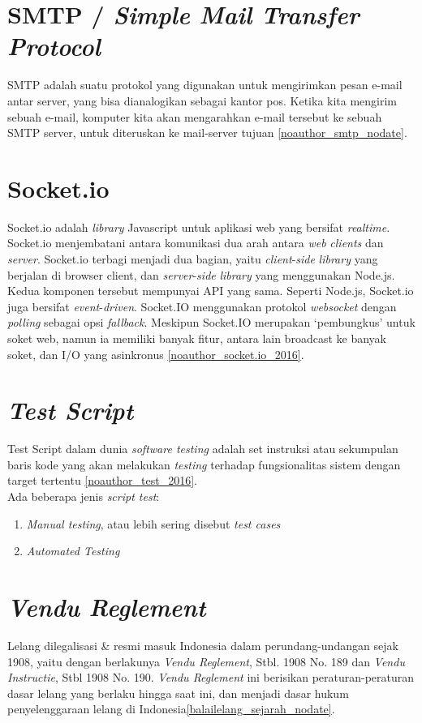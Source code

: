 	\section{SMTP / \textit{Simple Mail Transfer Protocol}}
	SMTP adalah suatu protokol yang digunakan untuk mengirimkan pesan e-mail antar server, yang bisa dianalogikan sebagai kantor pos. Ketika kita mengirim sebuah e-mail, komputer kita akan mengarahkan e-mail tersebut ke sebuah SMTP server, untuk diteruskan ke mail-server tujuan \ref{noauthor_smtp_nodate}. 
	
	\section{Socket.io}
	Socket.io adalah \textit{library} Javascript untuk aplikasi web yang bersifat \textit{realtime}. Socket.io menjembatani antara komunikasi dua arah antara \textit{web} \textit{clients} dan \textit{server}. Socket.io terbagi menjadi dua bagian, yaitu \textit{client}-\textit{side} \textit{library} yang berjalan di browser client, dan \textit{server}-\textit{side} \textit{library} yang menggunakan Node.js. Kedua komponen tersebut mempunyai API yang sama. Seperti Node.js, Socket.io juga bersifat \textit{event}-\textit{driven}. Socket.IO menggunakan protokol \textit{websocket} dengan \textit{polling} sebagai opsi \textit{fallback}. Meskipun Socket.IO merupakan ‘pembungkus’ untuk soket web, namun ia memiliki banyak fitur, antara lain broadcast ke banyak soket, dan I/O yang asinkronus \ref{noauthor_socket.io_2016}.
	
	\section{\textit{Test Script}}
	Test Script dalam dunia \textit{software testing} adalah set instruksi atau sekumpulan baris kode yang akan melakukan \textit{testing} terhadap fungsionalitas sistem dengan target tertentu \ref{noauthor_test_2016}.
	\\ \indent Ada beberapa jenis \textit{script test}:
	\begin{enumerate}
	  	\item \textit{Manual testing}, atau lebih sering disebut \textit{test cases}
	  	\item \textit{Automated Testing}
	\end{enumerate}
	
	\section{\textit{Vendu Reglement}}
	Lelang dilegalisasi \& resmi masuk Indonesia dalam perundang-undangan sejak 1908, yaitu dengan berlakunya \textit{Vendu Reglement}, Stbl. 1908 No. 189 dan \textit{Vendu Instructie}, Stbl 1908 No. 190. \textit{Vendu Reglement} ini berisikan peraturan-peraturan dasar lelang yang berlaku hingga saat ini, dan menjadi dasar hukum penyelenggaraan lelang di Indonesia\ref{balailelang_sejarah_nodate}.
	
